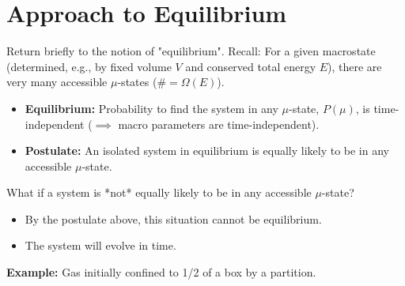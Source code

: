 \documentclass[11pt]{article}
\newcommand{\OmegaE}{\Omega(E)}
\begin{document}
\section*{Approach to Equilibrium}

Return briefly to the notion of "equilibrium".
Recall: For a given macrostate (determined, e.g., by fixed volume $V$ and conserved total energy $E$), there are very many accessible $\mu$-states ($\# = \OmegaE$).
\begin{itemize}
    \item \textbf{Equilibrium:} Probability to find the system in any $\mu$-state, $P(\mu)$, is time-independent ($\implies$ macro parameters are time-independent).
    \item \textbf{Postulate:} An isolated system in equilibrium is equally likely to be in any accessible $\mu$-state.
\end{itemize}
What if a system is *not* equally likely to be in any accessible $\mu$-state?
\begin{itemize}
    \item By the postulate above, this situation cannot be equilibrium.
    \item The system will evolve in time.
\end{itemize}

\textbf{Example:} Gas initially confined to 1/2 of a box by a partition.

\begin{center}
\end{center}
\end{document}
